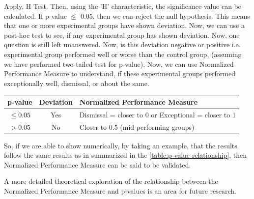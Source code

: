 \documentclass[a4paper,fleqn,review]{cas-sc}
\begin{document}
Apply, \cite{kruskal1952use} H Test. Then, using the 'H' characteristic, the significance value can be calculated. If p-value $\le$ 0.05, then we can reject the null hypothesis. This means that one or more experimental groups have shown deviation. Now, we can use a post-hoc \cite{dunnett1955multiple} test to see, if any experimental group has shown deviation. Now, one question is still left unanswered. Now, is this deviation negative or positive i.e. experimental group performed well or worse than the control group, (assuming we have performed two-tailed test for p-value). Now, we can use Normalized Performance Measure to understand, if these experimental groups performed exceptionally well, dismissal, or about the same.
\begin{center}
	\begin{tabular}{|c|c|l|}
		\hline
		\textbf{p-value} & \textbf{Deviation} & \textbf{Normalized Performance Measure} \\
		\hline
		$\leq 0.05$ & Yes & Dismissal = closer to 0 or Exceptional = closer to 1 \\
		\hline
		$> 0.05$ & No & Closer to 0.5 (mid-performing groups) \\
		\hline
	\end{tabular}
	\vspace{2pt}
	\label{table:p-value-relationship}
\end{center}
So, if we are able to show numerically, by taking an example, that the results follow the same results as in summarized in the \autoref{table:p-value-relationship}, then Normalized Performance Measure can be said to be validated.

A more detailed theoretical exploration of the relationship between the Normalized Performance Measure and p-values is an area for future research.
\end{document}
